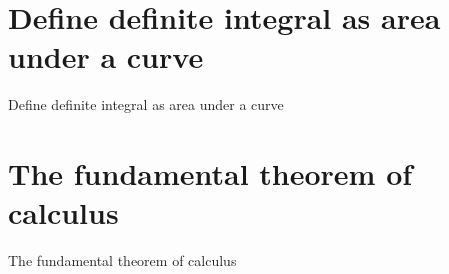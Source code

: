 \documentclass{book}
\begin{document}
\section{Define definite integral as area under a curve}

Define definite integral as area under a curve

\section{The fundamental theorem of calculus}

The fundamental theorem of calculus



\backmatter
 
\end{document}
